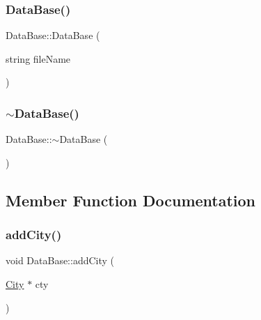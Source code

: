 \subsubsection{\texorpdfstring{Data\+Base()}{DataBase()}}
{\footnotesize\ttfamily Data\+Base\+::\+Data\+Base (\begin{DoxyParamCaption}\item[{string}]{file\+Name }\end{DoxyParamCaption})}

\mbox{\label{class_data_base_a9d4629e705ccaa4897e9650222a2a648}} 
\subsubsection{\texorpdfstring{$\sim$\+Data\+Base()}{~DataBase()}}
{\footnotesize\ttfamily Data\+Base\+::$\sim$\+Data\+Base (\begin{DoxyParamCaption}{ }\end{DoxyParamCaption})\hspace{0.3cm}{\ttfamily [inline]}}



\subsection{Member Function Documentation}
\mbox{\label{class_data_base_a090b459850b95afaaa23cba4339508e3}} 
\subsubsection{\texorpdfstring{add\+City()}{addCity()}}
{\footnotesize\ttfamily void Data\+Base\+::add\+City (\begin{DoxyParamCaption}\item[{\hyperlink{class_city}{City} $\ast$}]{cty }\end{DoxyParamCaption})\hspace{0.3cm}{\ttfamily [inline]}}

